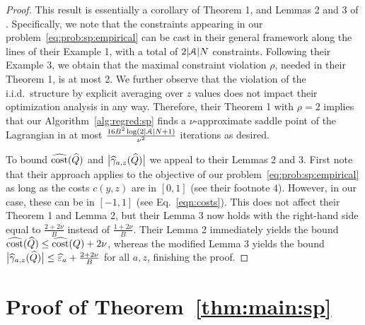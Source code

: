 \begin{proof}
This result is essentially a corollary of Theorem 1, and Lemmas 2 and 3 of \citet{agarwal2018reductions}. Specifically, we note that the constraints appearing in our problem~\eqref{eq:prob:sp:empirical} can be cast in their general framework along the lines of their Example 1, with a total of $2\lvert\mathcal{A}\rvert N$ constraints.
%
%
Following their Example 3, we obtain that the maximal constraint violation $\rho$, needed in their Theorem 1, is at most 2. We further observe that the violation of the i.i.d.\ structure by explicit averaging over $z$ values does not impact their optimization analysis in any way.
%
Therefore, their Theorem 1 with $\rho=2$ implies that our Algorithm~\ref{alg:regred:sp} finds a $\nu$-approximate saddle point of the Lagrangian in at most $\frac{16 B^2\log(2\lvert\mathcal{A}\rvert N+1)}{\nu^2}$ iterations as desired.

To bound $\widehat{\textup{\mdseries cost}}(\widehat{Q})$ and $\bigl\lvert\widehat{\gamma}_{a,z}(\widehat{Q})\bigr\rvert$ we appeal to their Lemmas 2 and 3. First note that
their approach applies to the objective of our problem~\eqref{eq:prob:sp:empirical} as long as the costs $c(y,z)$ are in $[0,1]$ (see their footnote 4). However, in our case, these can be in $[-1,1]$ (see Eq.~\ref{eqn:costs}). This does not affect their Theorem 1 and Lemma 2, but their Lemma 3 now holds with the right-hand side equal to $\frac{2+2\nu}{B}$ instead of $\frac{1+2\nu}{B}$. Their Lemma 2 immediately yields the bound $\widehat{\textup{\mdseries cost}}(\widehat{Q})\le\widehat{\textup{\mdseries cost}}(Q)+2\nu$, whereas the modified Lemma 3 yields the bound
$\bigl\lvert\widehat{\gamma}_{a,z}(\widehat{Q})\bigr\rvert
 \le\widehat{\varepsilon}_{a}+\frac{2+2\nu}{B}$ for all $a,z$, finishing the proof.
%
%
%
\end{proof}

\section{Proof of Theorem~\ref{thm:main:sp}}
\label{app:thm:main:sp}

